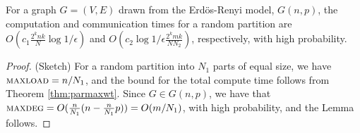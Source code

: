 \begin{lemma}
For a graph $G=(V, E)$ drawn from the Erd\"{o}s-Renyi model, $G(n, p)$, the computation and communication times for a random partition are $O(c_1\frac{2^knk}{N}\log{1/\epsilon})$ and $O(c_2 \log{1/\epsilon} \frac{2^kmk}{N N_2})$, respectively, with high probability.
\end{lemma}
\begin{proof} (Sketch)
For a random partition into $N_1$ parts of equal size, we have $\textsc{maxload}{}=n/N_1$, and the bound for the total compute time follows from Theorem \ref{thm:parmaxwt}. Since $G\in G(n, p)$, we have that $\textsc{maxdeg}{}=O(\frac{n}{N_1}(n-\frac{n}{N_1}p)) = O(m/N_1)$, with high probability, and the Lemma follows.
\end{proof}




